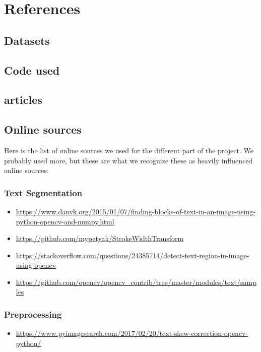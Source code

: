 \documentclass[Report.tex]{subfiles}
\begin{document}
\chapter{References}
\label{chap:References}
\section{Datasets}
\section{Code used}
\section{articles}
\section{Online sources}
Here is the list of online sources we used for the different part of the project. We probably used more, but these are what we recognize these as heavily influenced online sources:  

\subsection{Text Segmentation}
\begin{itemize}
    \item \href{https://www.danvk.org/2015/01/07/finding-blocks-of-text-in-an-image-using-python-opencv-and-numpy.html}{https://www.danvk.org/2015/01/07/finding-blocks-of-text-in-an-image-using-python-opencv-and-numpy.html}
    \item \href{https://github.com/mypetyak/StrokeWidthTransform}{https://github.com/mypetyak/StrokeWidthTransform}
    \item \href{https://stackoverflow.com/questions/24385714/detect-text-region-in-image-using-opencv}{https://stackoverflow.com/questions/24385714/detect-text-region-in-image-using-opencv}
    \item \href{https://github.com/opencv/opencv_contrib/tree/master/modules/text/samples}{https://github.com/opencv/opencv\_contrib/tree/master/modules/text/samples}
\end{itemize}
\subsection{Preprocessing}
\begin{itemize}
    \item \href{https://www.pyimagesearch.com/2017/02/20/text-skew-correction-opencv-python/}{https://www.pyimagesearch.com/2017/02/20/text-skew-correction-opencv-python/}
\end{itemize}
\end{document}
